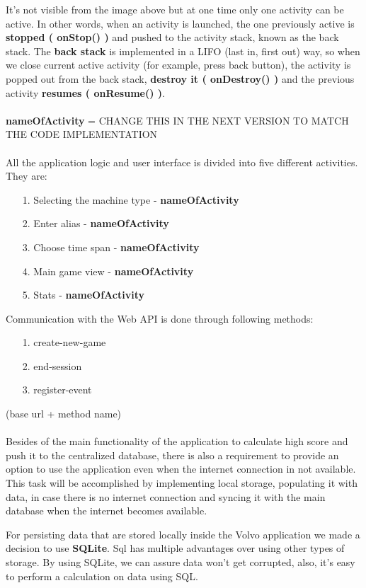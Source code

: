 \documentclass{article}
\begin{document}
It’s not visible from the image above but at one time only one activity can be active. In other words, when an activity is launched, the one previously active is \textbf{stopped ( onStop() )} and pushed to the activity stack, known as the back stack. The \textbf{back stack} is implemented in a LIFO (last in, first out) way, so when we close current active activity (for example, press back button), the activity is popped out from the back stack, \textbf{destroy it ( onDestroy() )} and the previous activity \textbf{resumes ( onResume() )}.  
\\ \\
\textbf{nameOfActivity}  = CHANGE THIS IN THE NEXT VERSION TO MATCH THE CODE IMPLEMENTATION
\\ \\
All the application logic and user interface is divided into five different activities. They are: 
\begin{itemize}
\item[1.]Selecting the machine type - \textbf{nameOfActivity }
\item[2.]Enter alias - \textbf{nameOfActivity }
\item[3.]Choose time span - \textbf{nameOfActivity }
\item[4.]Main game view - \textbf{nameOfActivity }
\item[5.]Stats - \textbf{nameOfActivity }
\end{itemize}
Communication with the Web API is done through following methods:
\begin{itemize}
\item[1.]create-new-game 
\item[2.]end-session
\item[3.]register-event
\end{itemize}
(base url + method name)
\\ \\
Besides of the main functionality of the application to calculate high score and push it to the centralized database, there is also a requirement to provide an option to use the application even when the internet connection in not available. This task will be accomplished by implementing local storage, populating it with data, in case there is no internet connection and syncing it with the main database when the internet becomes available.

For persisting data that are stored locally inside the Volvo application we made a decision to use \textbf{SQLite}. Sql has multiple advantages over using other types of storage. By using SQLite, we can assure data won’t get corrupted, also, it’s easy to perform a calculation on data using SQL.
\end{document}
